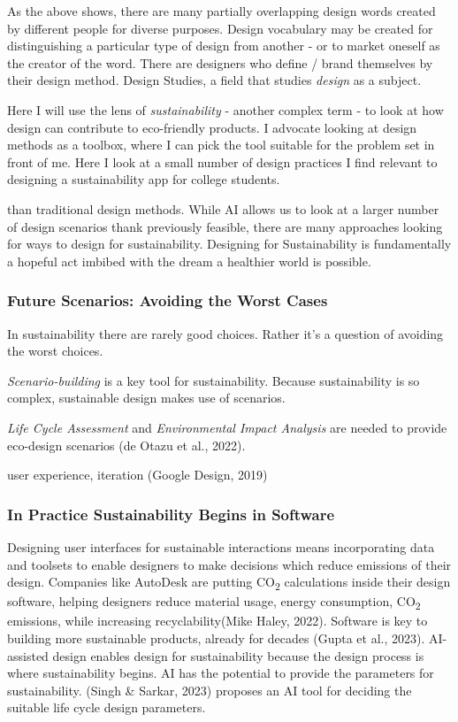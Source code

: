 \documentclass[
  letterpaper,
  DIV=11,
  numbers=noendperiod]{scrartcl}
\begin{document}
As the above shows, there are many partially overlapping design words
created by different people for diverse purposes. Design vocabulary may
be created for distinguishing a particular type of design from another -
or to market oneself as the creator of the word. There are designers who
define / brand themselves by their design method. Design Studies, a
field that studies \emph{design} as a subject.

Here I will use the lens of \emph{sustainability} - another complex term
- to look at how design can contribute to eco-friendly products. I
advocate looking at design methods as a toolbox, where I can pick the
tool suitable for the problem set in front of me. Here I look at a small
number of design practices I find relevant to designing a sustainability
app for college students.

than traditional design methods. While AI allows us to look at a larger
number of design scenarios thank previously feasible, there are many
approaches looking for ways to design for sustainability. Designing for
Sustainability is fundamentally a hopeful act imbibed with the dream a
healthier world is possible.

\subsubsection{Future Scenarios: Avoiding the Worst
Cases}\label{future-scenarios-avoiding-the-worst-cases}

In sustainability there are rarely good choices. Rather it's a question
of avoiding the worst choices.

\emph{Scenario-building} is a key tool for sustainability. Because
sustainability is so complex, sustainable design makes use of scenarios.

\emph{Life Cycle Assessment} and \emph{Environmental Impact Analysis}
are needed to provide eco-design scenarios (de Otazu et al., 2022).

user experience, iteration (Google Design, 2019)

\subsubsection{In Practice Sustainability Begins in
Software}\label{in-practice-sustainability-begins-in-software}

Designing user interfaces for sustainable interactions means
incorporating data and toolsets to enable designers to make decisions
which reduce emissions of their design. Companies like AutoDesk are
putting CO\textsubscript{2} calculations inside their design software,
helping designers reduce material usage, energy consumption,
CO\textsubscript{2} emissions, while increasing recyclability(Mike
Haley, 2022). Software is key to building more sustainable products,
already for decades (Gupta et al., 2023). AI-assisted design enables
design for sustainability because the design process is where
sustainability begins. AI has the potential to provide the parameters
for sustainability. (Singh \& Sarkar, 2023) proposes an AI tool for
deciding the suitable life cycle design parameters.
\end{document}
